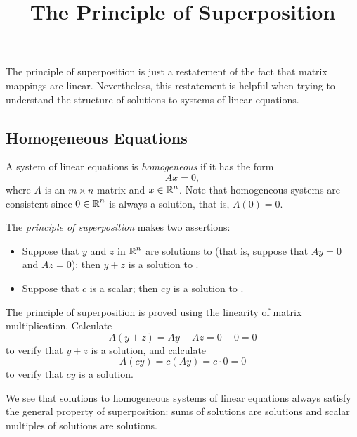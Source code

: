\documentclass{ximera}
\title{The Principle of Superposition}
\begin{document}
\begin{abstract}
\end{abstract}
\maketitle


\label{S:Superposition}

The principle of superposition is just a restatement of the fact
that matrix mappings are linear.  Nevertheless, this restatement
is helpful when trying to understand the structure of solutions
to systems of linear equations.

\subsection*{Homogeneous Equations}

A system of linear equations is {\em homogeneous\/} if it has
the form
\begin{equation} \label{homosys}
Ax=0,
\end{equation}
where $A$ is an $m\times n$ matrix and $x\in\mbox{$\Bbb{R}$}^n$.  Note that
homogeneous systems are consistent since $0\in\mbox{$\Bbb{R}$}^n$ is always a
solution, that is, $A(0)=0$.

The {\em principle of superposition\/}   makes two assertions:
\begin{itemize}
\item  Suppose that $y$ and $z$ in $\mbox{$\Bbb{R}$}^n$ are solutions to 
(that is, suppose that $Ay=0$ and $Az=0$); then $y+z$ is a solution
to .
\item Suppose that $c$ is a scalar; then $cy$ is a solution to
.
\end{itemize}
The principle of superposition is proved using the linearity of matrix 
multiplication.  Calculate
\[
A(y+z) = Ay + Az = 0+0=0
\]
to verify that $y+z$ is a solution, and calculate
\[
A(cy) = c(Ay) = c\cdot 0 = 0
\]
to verify that $cy$ is a solution.

We see that solutions to homogeneous systems of linear equations
always satisfy the general property of superposition: sums of
solutions are solutions and scalar multiples of solutions are
solutions.
\end{document}

